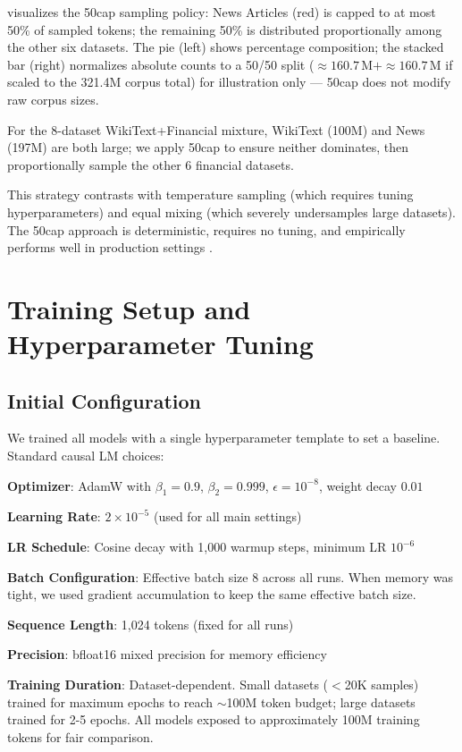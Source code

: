  visualizes the 50cap sampling policy: News Articles (red) is capped to at most 50\% of sampled tokens; the remaining 50\% is distributed proportionally among the other six datasets. The pie (left) shows percentage composition; the stacked bar (right) normalizes absolute counts to a 50/50 split (\(\approx\!160.7\,\text{M}+\approx\!160.7\,\text{M}\) if scaled to the 321.4M corpus total) for illustration only — 50cap does not modify raw corpus sizes.

For the 8-dataset WikiText+Financial mixture, WikiText (100M) and News (197M) are both large; we apply 50cap to ensure neither dominates, then proportionally sample the other 6 financial datasets.

This strategy contrasts with temperature sampling (which requires tuning hyperparameters) and equal mixing (which severely undersamples large datasets). The 50cap approach is deterministic, requires no tuning, and empirically performs well in production settings \parencite{longpre2023pretrainer}.

\section{Training Setup and Hyperparameter Tuning}

\subsection{Initial Configuration}

We trained all models with a single hyperparameter template to set a baseline. Standard causal LM choices:

\textbf{Optimizer}: AdamW with $\beta_1=0.9$, $\beta_2=0.999$, $\epsilon=10^{-8}$, weight decay $0.01$

\textbf{Learning Rate}: $2 \times 10^{-5}$ (used for all main settings)

\textbf{LR Schedule}: Cosine decay with 1,000 warmup steps, minimum LR $10^{-6}$

\textbf{Batch Configuration}: Effective batch size 8 across all runs. When memory was tight, we used gradient accumulation to keep the same effective batch size.

\textbf{Sequence Length}: 1,024 tokens (fixed for all runs)

\textbf{Precision}: bfloat16 mixed precision for memory efficiency

\textbf{Training Duration}: Dataset-dependent. Small datasets ($<$20K samples) trained for maximum epochs to reach $\sim$100M token budget; large datasets trained for 2-5 epochs. All models exposed to approximately 100M training tokens for fair comparison.

